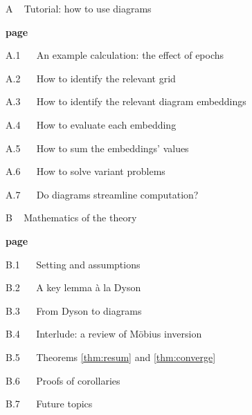 \documentclass[anon,12pt]{colt2021} %
\begin{document}
        {\bf
        \par\noindent A ~ Tutorial: how to use diagrams}                        \hfill {\bf page \pageref{appendix:tutorial}}
        \par\indent     A.1 ~~ An example calculation: the effect of epochs     \hfill \pageref{appendix:example}
        \par\indent     A.2 ~~ How to identify the relevant grid                \hfill \pageref{appendix:draw-spacetime} 
        \par\indent     A.3 ~~ How to identify the relevant diagram embeddings  \hfill \pageref{appendix:draw-embeddings}
        \par\indent     A.4 ~~ How to evaluate each embedding                   \hfill \pageref{appendix:evaluate-embeddings}
        \par\indent     A.5 ~~ How to sum the embeddings' values                \hfill \pageref{appendix:sum-embeddings}
        \par\indent     A.6 ~~ How to solve variant problems                    \hfill \pageref{appendix:solve-variants}
        \par\indent     A.7 ~~ Do diagrams streamline computation?              \hfill \pageref{appendix:diagrams-streamline}
    
        {\bf
        \par\noindent B ~ Mathematics of the theory}                            \hfill {\bf page \pageref{appendix:math}}
        \par\indent     B.1 ~~ Setting and assumptions                          \hfill \pageref{appendix:assumptions}
        \par\indent     B.2 ~~ A key lemma \`a la Dyson                         \hfill \pageref{appendix:key-lemma}
        \par\indent     B.3 ~~ From Dyson to diagrams                           \hfill \pageref{appendix:toward-diagrams}
        \par\indent     B.4 ~~ Interlude: a review of M\"obius inversion        \hfill \pageref{appendix:mobius}
        \par\indent     B.5 ~~ Theorems \ref{thm:resum} and \ref{thm:converge}  \hfill \pageref{appendix:resum}
        \par\indent     B.6 ~~ Proofs of corollaries                            \hfill \pageref{appendix:corollaries}
        \par\indent     B.7 ~~ Future topics                                    \hfill \pageref{appendix:future}
    
\end{document}

